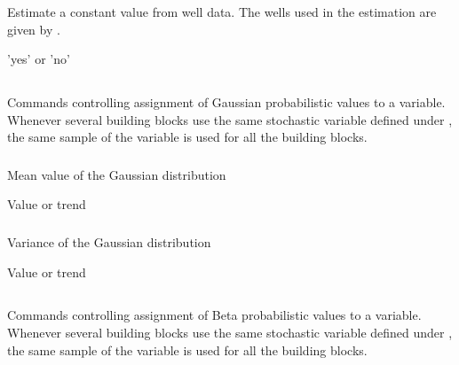 {\subsubsection{}
 \slist
   \item \Description Estimate a constant value from well data. The wells used in the estimation are given by .
   \item \Argument 'yes' or 'no'
   \item \Default 
 \elist

\subsection{}
 \slist
   \item \Description Commands controlling assignment of Gaussian probabilistic values to a variable. Whenever several building blocks use the same stochastic variable defined under , the same sample of the variable is used for all the building blocks. 
   \item \Argument
   \item \Default 
 \elist

\subsubsection{}
 \slist
   \item \Description Mean value of the Gaussian distribution
   \item \Argument Value or trend
   \item \Default 
 \elist

\subsubsection{}
 \slist
   \item \Description Variance of the Gaussian distribution
   \item \Argument Value or trend
   \item \Default 
 \elist

\subsection{}
 \slist
   \item \Description Commands controlling assignment of Beta probabilistic values to a variable. Whenever several building blocks use the same stochastic variable defined under , the same sample of the variable is used for all the building blocks. 
   \item \Argument
   \item \Default 
 \elist

}
